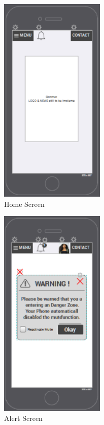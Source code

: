 \begin{figure}[htbp]
\begin{center}
 \caption{\label{fig:A2C} Home Screen}
   \includegraphics[width=50mm]{./images/App/chome.eps}
\end{center}
\end{figure} 
\begin{figure}[htbp]
\begin{center}
 \caption{\label{fig:A4} Alert Screen}
   \includegraphics[width=50mm]{./images/App/alerscreen.eps}
\end{center}
\end{figure} 
